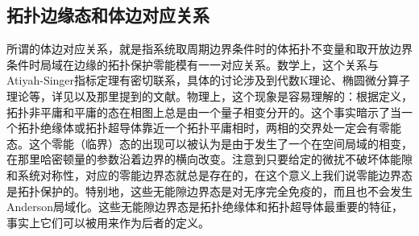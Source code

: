 \subsection{拓扑边缘态和体边对应关系}
\label{subsec:tebbc}
所谓的体边对应关系，就是指系统取周期边界条件时的体拓扑不变量和取开放边界条件时局域在边缘的拓扑保护零能模有一一对应关系。数学上，这个关系与Atiyah-Singer指标定理有密切联系，具体的讨论涉及到代数K理论、椭圆微分算子理论等，详见\cite{Chiu2016}以及那里提到的文献。物理上，这个现象是容易理解的：根据定义，拓扑非平庸和平庸的态在相图上总是由一个量子相变分开的。这个事实暗示了当一个拓扑绝缘体或拓扑超导体靠近一个拓扑平庸相时，两相的交界处一定会有零能态。这个零能（临界）态的出现可以被认为是由于发生了一个在空间局域的相变，在那里哈密顿量的参数沿着边界的横向改变。注意到只要给定的微扰不破坏体能隙和系统对称性，对应的零能边界态就总是存在的，在这个意义上我们说零能边界态是拓扑保护的。特别地，这些无能隙边界态是对无序完全免疫的，而且也不会发生Anderson局域化。这些无能隙边界态是拓扑绝缘体和拓扑超导体最重要的特征，事实上它们可以被用来作为后者的定义。











